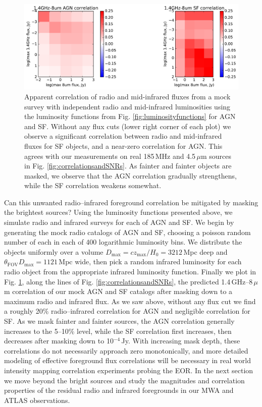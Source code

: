 \documentclass[numberedappendix]{emulateapj}
\newcommand{\maxtext}{\text{max}}
\begin{document}
\begin{figure}[h]
\centering
\includegraphics[width=6in]{sim_correlation_agn_and_sf.pdf}
\caption[Apparent correlation of radio and mid-infrared fluxes from a mock survey.]{Apparent correlation of radio and mid-infrared fluxes from a mock survey with independent radio and mid-infrared luminosities using the luminosity functions from Fig. \ref{fig:luminosityfunctions} for AGN and SF. Without any flux cuts (lower right corner of each plot) we observe a significant correlation between radio and mid-infrared fluxes for SF objects, and a near-zero correlation for AGN. This agrees with our measurements on real 185\,MHz and 4.5\,$\mu$m sources in Fig. \ref{fig:correlationsandSNRs}. As fainter and fainter objects are masked, we observe that the AGN correlation gradually strengthens, while the SF correlation weakens somewhat. }
\label{fig:simagnlfcorrelations}
\end{figure}

Can this unwanted radio--infrared foreground correlation be mitigated by masking the brightest sources? Using the luminosity functions presented above, we simulate radio and infrared surveys for each of AGN and SF. We begin by generating the mock radio catalogs of AGN and SF, choosing a poisson random number of each in each of 400 logarithmic luminosity bins. We distribute the objects uniformly over a volume $D_\maxtext=cz_\maxtext/H_0=3212$\,Mpc deep and $\theta_{\text{FOV}}D_\maxtext=1121$\,Mpc wide, then pick a random infrared luminosity for each radio object from the appropriate infrared luminosity function. Finally we plot in Fig. \ref{fig:simagnlfcorrelations}, along the lines of Fig. \ref{fig:correlationsandSNRs}, the predicted 1.4\,GHz--8\,$\mu$m correlation of our mock AGN and SF catalogs after masking down to a maximum radio and infrared flux. As we saw above, without any flux cut we find a roughly 20\% radio--infrared correlation for AGN and negligible correlation for SF. As we mask fainter and fainter sources, the AGN correlation generally increases to the 5--10\% level, while the SF correlation first increases, then decreases after masking down to 10$^{-4}$\,Jy. With increasing mask depth, these correlations do not necessarily approach zero monotonically, and more detailed modeling of effective foreground flux correlations will be necessary in real world intensity mapping correlation experiments probing the EOR. In the next section we move beyond the bright sources and study the magnitudes and correlation properties of the residual radio and infrared foregrounds in our MWA and ATLAS observations.
\end{document}
